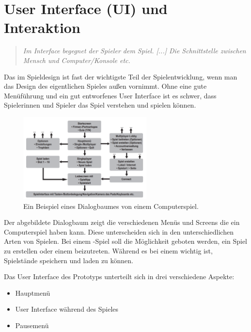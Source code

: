 
\chapter{User Interface (UI) und Interaktion}

\begin{quote}
\emph{\glqq Im Interface begegnet der Spieler dem Spiel. [...] Die Schnittstelle zwischen Mensch und Computer/Konsole etc.\grqq}~\cite[][Game Design und Produktion: Grundlagen, Anwendungen und Beispiele; p.~161]{GameDesign} \\ 
\end{quote}

Das  im Spieldesign ist fast der wichtigste Teil der Spielentwicklung, wenn man das Design des eigentlichen Spieles außen vornimmt. Ohne eine gute Menüführung und ein gut entworfenes User Interface ist es schwer, dass Spielerinnen und Spieler das Spiel verstehen und spielen können. 

\begin{figure}[H]
  \centering
  \includegraphics[width=0.6\textwidth]{chapters/03/images/Spielinterface.png}
  \caption{Ein Beispiel eines Dialogbaumes von einem Computerspiel.}
  \label{htl01}
\end{figure}

Der abgebildete Dialogbaum zeigt die verschiedenen Menüs und Screens die ein Computerspiel haben kann. Diese unterscheiden sich in den unterschiedlichen Arten von Spielen. Bei einem -Spiel soll die Möglichkeit geboten werden, ein Spiel zu erstellen oder einem beizutreten. Während es bei einem  wichtig ist, Spielstände speichern und laden zu können.

\pagebreak

Das User Interface des Prototyps unterteilt sich in drei verschiedene Aspekte:

\begin{itemize}
    \item Hauptmenü
    \item User Interface während des Spieles
    \item Pausemenü
\end{itemize}

